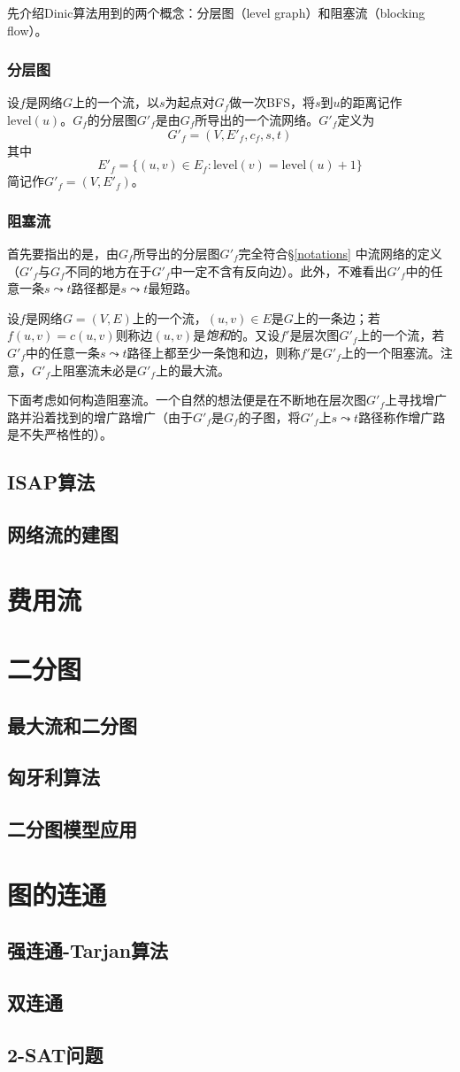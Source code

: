 \documentclass[fontset=ubuntu]{ctexbook}
\begin{document}
    先介绍Dinic算法用到的两个概念：分层图（level graph）和阻塞流（blocking flow）。
    \subsubsection*{分层图}
    设$f$是网络$G$上的一个流，以$s$为起点对$G_f$做一次BFS，将$s$到$u$的距离记作$\mathrm{level}(u)$。$G_f$的分层图$G'_f$是由$G_f$所导出的一个流网络。$G'_f$定义为
    \[
    G'_f =(V, E'_f, c_f, s, t)
    \]
    其中
    \[
    E'_f = \{(u,v)\in E_f\colon \mathrm{level}(v) = \mathrm{level}(u)+1\}
    \]
    简记作$G'_f =(V, E'_f)$。
    \subsubsection{阻塞流}
    首先要指出的是，由$G_f$所导出的分层图$G'_f$完全符合\S\ref{notations} 中流网络的定义（$G'_f$与$G_f$不同的地方在于$G'_f$中一定不含有反向边）。此外，不难看出$G'_f$中的任意一条$s\leadsto t$路径都是$s\leadsto t$最短路。

    设$f$是网络$G=(V,E)$上的一个流，$(u,v)\in E$是$G$上的一条边；若$f(u,v) = c(u,v)$则称边$(u,v)$是\emph{饱和}的。又设$f'$是层次图$G'_f$上的一个流，若$G'_f$中的任意一条$s\leadsto t$路径上都至少一条饱和边，则称$f'$是$G'_f$上的一个阻塞流。注意，$G'_f$上阻塞流未必是$G'_f$上的最大流。

    下面考虑如何构造阻塞流。一个自然的想法便是在不断地在层次图$G'_f$上寻找增广路并沿着找到的增广路增广（由于$G'_f$是$G_f$的子图，将$G'_f$上$s\leadsto t$路径称作增广路是不失严格性的）。
    \subsection{ISAP算法}
    \subsection{网络流的建图}
    \section{费用流}
    \section{二分图}
    \subsection{最大流和二分图}
    \subsection{匈牙利算法}
    \subsection{二分图模型应用}
    \section{图的连通}
    \subsection{强连通-Tarjan算法}
    \subsection{双连通}
    \subsection{2-SAT问题}
\end{document}
